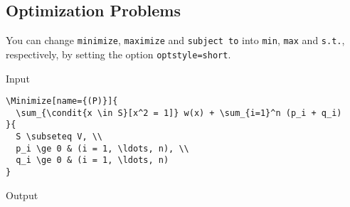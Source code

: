 \documentclass[a4paper, 11pt]{article}
\begin{document}
\subsection{Optimization Problems}

You can change \texttt{minimize}, \texttt{maximize} and \texttt{subject to} into \texttt{min}, \texttt{max} and \texttt{s.t.}, respectively, by setting the option \texttt{optstyle=short}.

\begin{itembox}[l]{Input}
\begin{verbatim}
\Minimize[name={(P)}]{
  \sum_{\condit{x \in S}[x^2 = 1]} w(x) + \sum_{i=1}^n (p_i + q_i)
}{
  S \subseteq V, \\
  p_i \ge 0 & (i = 1, \ldots, n), \\
  q_i \ge 0 & (i = 1, \ldots, n)
}
\end{verbatim}
\end{itembox}

\begin{itembox}[l]{Output}
\end{itembox}
\end{document}
